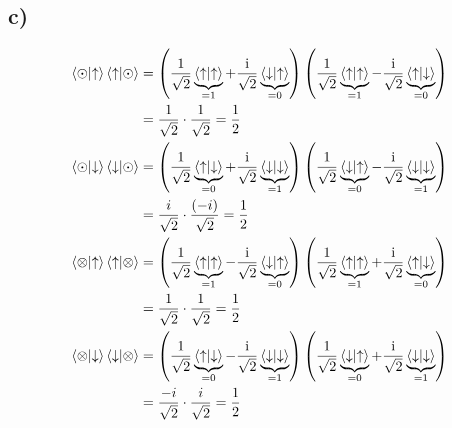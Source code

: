     \subsection{c)}

    \begin{align*}
    \braket{\odot}{\uparrow}\braket{\uparrow}{\odot} &= 
    \left( \frac{1}{\sqrt{2}} \underbrace{\braket{\uparrow}{\uparrow}}_{=1} + \frac{\text{i}}{\sqrt{2}} \underbrace{\braket{\downarrow}{\uparrow}}_{=0} \right)
    \left( \frac{1}{\sqrt{2}} \underbrace{\braket{\uparrow}{\uparrow}}_{=1} - \frac{\text{i}}{\sqrt{2}} \underbrace{\braket{\uparrow}{\downarrow}}_{=0} \right)\\
    &= \frac{1}{\sqrt{2}} \cdot \frac{1}{\sqrt{2}} = \frac{1}{2}\\
    \braket{\odot}{\downarrow}\braket{\downarrow}{\odot} &= 
    \left( \frac{1}{\sqrt{2}} \underbrace{\braket{\uparrow}{\downarrow}}_{=0} + \frac{\text{i}}{\sqrt{2}} \underbrace{\braket{\downarrow}{\downarrow}}_{=1} \right)
    \left( \frac{1}{\sqrt{2}} \underbrace{\braket{\downarrow}{\uparrow}}_{=0} - \frac{\text{i}}{\sqrt{2}} \underbrace{\braket{\downarrow}{\downarrow}}_{=1} \right)\\
    &= \frac{i}{\sqrt{2}} \cdot \frac{(-i)}{\sqrt{2}} = \frac{1}{2}\\
    \braket{\otimes}{\uparrow}\braket{\uparrow}{\otimes} &= 
    \left( \frac{1}{\sqrt{2}} \underbrace{\braket{\uparrow}{\uparrow}}_{=1} - \frac{\text{i}}{\sqrt{2}} \underbrace{\braket{\downarrow}{\uparrow}}_{=0} \right)
    \left( \frac{1}{\sqrt{2}} \underbrace{\braket{\uparrow}{\uparrow}}_{=1} + \frac{\text{i}}{\sqrt{2}} \underbrace{\braket{\uparrow}{\downarrow}}_{=0} \right)\\
    &= \frac{1}{\sqrt{2}} \cdot \frac{1}{\sqrt{2}} = \frac{1}{2}\\
    \braket{\otimes}{\downarrow}\braket{\downarrow}{\otimes} &= 
    \left( \frac{1}{\sqrt{2}} \underbrace{\braket{\uparrow}{\downarrow}}_{=0} - \frac{\text{i}}{\sqrt{2}} \underbrace{\braket{\downarrow}{\downarrow}}_{=1} \right)
    \left( \frac{1}{\sqrt{2}} \underbrace{\braket{\downarrow}{\uparrow}}_{=0} + \frac{\text{i}}{\sqrt{2}} \underbrace{\braket{\downarrow}{\downarrow}}_{=1} \right)\\
    &= \frac{-i}{\sqrt{2}} \cdot \frac{i}{\sqrt{2}} = \frac{1}{2}\\
    \end{align*}

